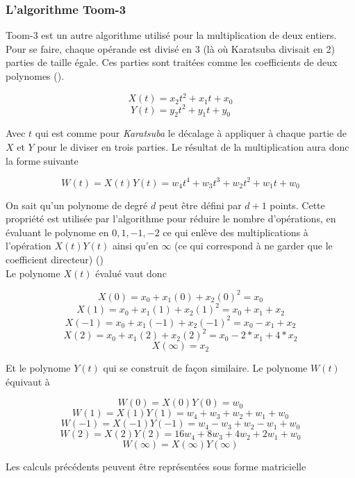 \documentclass[letterpaper]{article}
\begin{document}
\subsubsection{L'algorithme Toom-3}

Toom-3 est un autre algorithme utilisé pour la multiplication de deux
entiers. Pour se faire, chaque opérande est divisé en 3 (là où Karatsuba
divisait en 2) parties de taille égale. Ces parties sont traitées comme les
coefficients de deux polynomes (\cite{gmplib2014}).

    $$X(t) = x_2 t^2 + x_1 t + x_0$$
    $$Y(t) = y_2 t^2 + y_1 t + y_0$$

Avec $t$ qui est comme pour \emph{Karatsuba} le décalage à appliquer à chaque
partie de $X$ et $Y$ pour le diviser en trois parties.
Le résultat de la multiplication aura donc la forme suivante

    $$W(t) = X(t) Y(t) =  w_4 t^4 + w_3 t^3 + w_2 t^2 + w_1 t + w_0$$

On sait qu'un polynome de degré $d$ peut être défini par $d + 1$ points. Cette
propriété est utilisée par l'algorithme pour réduire le nombre d'opérations,
en évaluant le polynome en $0, 1, -1, -2$ ce qui enlève des multiplications
à l'opération $X(t) Y(t)$ ainsi qu'en $\infty$ (ce qui correspond à ne garder
que le coefficient directeur) (\cite{wikitoom3})\\

Le polynome $X(t)$ évalué vaut donc

    $$X(0) = x_{0} + x_{1} (0) + x_2 {(0)}^{2} = x_{0}$$
    $$X(1) = x_0 + x_1(1) + x_2{(1)}^2 = x_0 + x_1 + x_2$$
    $$X(-1) = x_0 + x_1(-1) + x_2{(-1)}^2 = x_0 - x_1 + x_2$$
    $$X(2) = x_0 + x_1(2) + x_2{(2)}^2 = x_0 - 2 * x_1 + 4 * x_2$$
    $$X(\infty) = x_2$$

Et le polynome $Y(t)$ qui se construit de façon similaire. Le polynome $W(t)$
équivaut à

    $$W(0) = X(0)Y(0) = w_0$$
    $$W(1) = X(1)Y(1) = w_4 + w_3 + w_2 + w_1 + w_0$$
    $$W(-1) =X(-1)Y(-1) = w_4 - w_3 + w_2 - w_1 + w_0$$
    $$W(2) = X(2)Y(2) = 16 w_4 + 8 w_3 + 4 w_2 + 2 w_1 + w_0$$
    $$W(\infty) = X(\infty)Y(\infty)$$

Les calculs précédents peuvent être représentées sous forme matricielle
\end{document}
